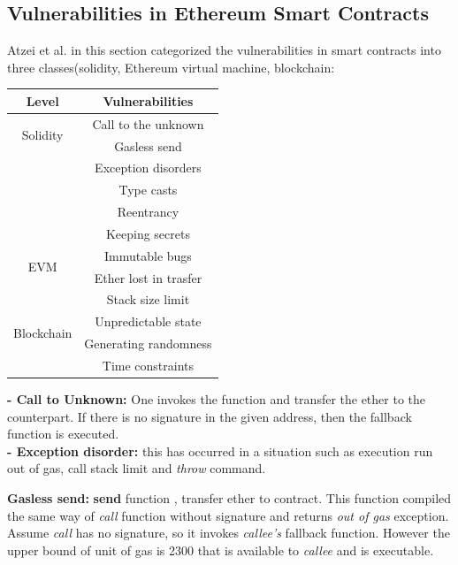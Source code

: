 \subsection{Vulnerabilities in Ethereum Smart Contracts}

Atzei et al. in this section categorized the vulnerabilities in smart contracts into three classes(solidity, Ethereum virtual machine, blockchain:\\
\begin{center}
	\begin{tabular}{c |c }
		\hline
		Level & Vulnerabilities \\
		\hline
		\multirow{2}{4em}{Solidity} & Call to the unknown \\ & Gasless send \\ & Exception disorders  \\ & Type casts \\ & Reentrancy \\ & Keeping secrets \\
		\hline 
		\multirow{2}{4em}{EVM}& Immutable bugs \\ & Ether lost in trasfer \\ & Stack size limit \\
		\hline  
		\multirow{2}{4em}{Blockchain} & Unpredictable state \\ & Generating randomness \\ & Time constraints \\
		\hline
	\end{tabular}     
	
\end{center}

\textbf{- Call to Unknown:} One invokes the function and transfer the ether to the counterpart. If there is no signature in the given address, then the fallback function is executed.\\ 

\textbf{- Exception disorder: } this has occurred in a situation such as execution run out of gas, call stack limit and \textit{throw} command.

\textbf{Gasless send: }\textbf{send} function , transfer ether to contract. This function compiled the same way of \textit{call }function without signature and returns \textit{out of gas} exception.\\
Assume \textit{call} has no signature, so it invokes \textit{callee's } fallback  function. However  the upper bound of unit of gas is 2300 that is available to \textit{callee } and is executable.

